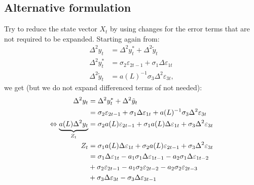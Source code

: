 \documentclass[a4paper,12pt]{article}
\begin{document}
\pagebreak

\subsection{Alternative formulation}

Try to reduce the state vector $X_{t}$ by using changes for the error terms
that are not required to be expanded. Starting again from:%
\begin{align}
\Delta ^{2}y_{t}& =\Delta ^{2}y_{t}^{\ast }+\Delta ^{2}\tilde{y}_{t} \\
\Delta ^{2}y_{t}^{\ast }& =\sigma _{2}\varepsilon _{2t-1}+\sigma _{1}\Delta
\varepsilon _{1t} \\
\Delta ^{2}\tilde{y}_{t}& =a(L)^{-1}\sigma _{3}\Delta ^{2}\varepsilon _{3t},
\end{align}%
we get (but we do not expand differenced terms of not needed):%
\begin{align}
\Delta ^{2}y_{t}& =\Delta ^{2}y_{t}^{\ast }+\Delta ^{2}\tilde{y}_{t}  \notag
\\
& =\sigma _{2}\varepsilon _{2t-1}+\sigma _{1}\Delta \varepsilon
_{1t}+a(L)^{-1}\sigma _{3}\Delta ^{2}\varepsilon _{3t}  \notag \\
\Leftrightarrow \underbrace{a(L)\Delta ^{2}y_{t}}_{Z_{t}}& =\sigma
_{2}a(L)\varepsilon _{2t-1}+\sigma _{1}a(L)\Delta \varepsilon _{1t}+\sigma
_{3}\Delta ^{2}\varepsilon _{3t}  \notag \\
Z_{t}& =\sigma _{1}a(L)\Delta \varepsilon _{1t}+\sigma _{2}a(L)\varepsilon
_{2t-1}+\sigma _{3}\Delta ^{2}\varepsilon _{3t}  \notag \\
& =\sigma _{1}\Delta \varepsilon _{1t}-a_{1}\sigma _{1}\Delta \varepsilon
_{1t-1}-a_{2}\sigma _{1}\Delta \varepsilon _{1t-2}  \notag \\
& +\sigma _{2}\varepsilon _{2t-1}-a_{1}\sigma _{2}\varepsilon
_{2t-2}-a_{2}\sigma _{2}\varepsilon _{2t-3} \\
& +\sigma _{3}\Delta \varepsilon _{3t}-\sigma _{3}\Delta \varepsilon _{3t-1}
\notag
\end{align}
\end{document}
